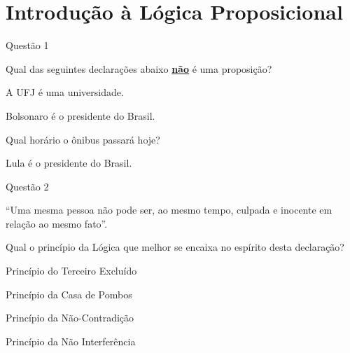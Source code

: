 \chapter{Introdução à Lógica Proposicional}

\begin{questao}{Questão 1}

Qual das seguintes declarações abaixo \underline{\textbf{não}} é uma proposição?

\begin{alternativas}
    \item A UFJ é uma universidade.
    \item Bolsonaro é o presidente do Brasil.
    \item Qual horário o ônibus passará hoje?
    \item Lula é o presidente do Brasil.
\end{alternativas}

\end{questao}

\begin{comentario_questao}






\end{comentario_questao}

\newpage

\begin{questao}{Questão 2}

``Uma mesma pessoa não pode ser, ao mesmo tempo, culpada e inocente em relação ao mesmo fato''.  

Qual o princípio da Lógica que melhor se encaixa no espírito desta declaração?

\begin{alternativas}
    \item Princípio do Terceiro Excluído
    \item Princípio da Casa de Pombos
    \item Princípio da Não-Contradição
    \item Princípio da Não Interferência
\end{alternativas}

\end{questao}

